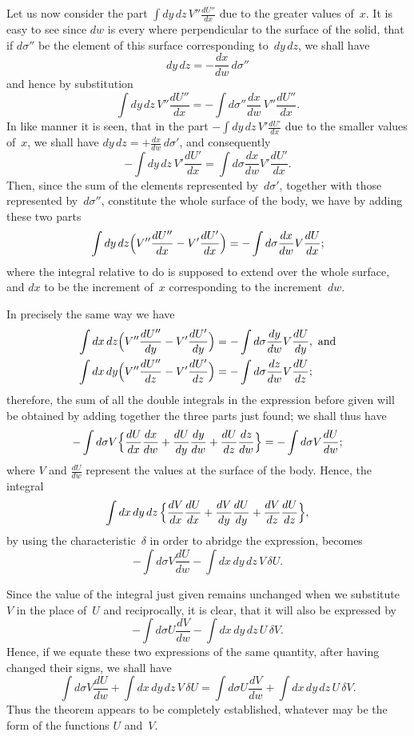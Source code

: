 \documentclass[12pt,notitlepage]{amsart}
\begin{document}
Let us now consider the part $\int dy\,dz\,V''\frac{dU''}{dx}$
due to the greater values
of~$x$. It is easy to see
since $dw$ is every where perpendicular to the surface
of the solid, that if $d\sigma''$ be the element
of this surface corresponding to~$dy\,dz$,
we shall have
\[
dy\,dz = -\frac{dx}{dw}\,d\sigma''
\]
and hence by substitution
\[
\int dy\,dz\,V''\frac{dU''}{dx}
=-\int d\sigma''\frac{dx}{dw}\,V''\frac{dU''}{dx}.
\]
In like manner it is seen, that in the part
$-\int dy\,dz\,V'\frac{dU'}{dx}$ due to the smaller
values of~$x$, we shall have $dy\,dz=+\frac{dx}{dw}\,d\sigma'$,
and consequently
\[
-\int dy\,dz\,V'\frac{dU'}{dx}=
\int d\sigma\frac{dx}{dw}V'\frac{dU'}{dx}.
\]
Then, since the sum of the elements represented by~$d\sigma'$,
together with those
represented by~$d\sigma''$,
constitute the whole surface of the body, we have by
adding these two parts
\[
\int dy\,dz\Bigl(V''\frac{dU''}{dx}-V'\frac{dU'}{dx}\Bigr)=
-\int d\sigma\frac{dx}{dw}V\frac{dU}{dx};
\]
where the integral relative to do is supposed to extend over the whole surface,
and $dx$ to be the increment of~$x$ corresponding to the increment~$dw$.

In precisely the same way we have
\[
\begin{aligned}
\int dx\,dz\Bigl(V''\frac{dU''}{dy}-V'\frac{dU'}{dy}\Bigr)&=
-\int d\sigma\frac{dy}{dw}V\frac{dU}{dy}, \text{~and}\\
\int dx\,dy\Bigl(V''\frac{dU''}{dz}-V'\frac{dU'}{dz}\Bigr)&=
-\int d\sigma\frac{dz}{dw}V\frac{dU}{dz};
\end{aligned}
\]
therefore, the sum of all the double integrals in the expression before given
will be obtained by adding together the three parts just found; we shall
thus have
\[
-\int d\sigma V\Bigl\{
  \frac{dU}{dx}\frac{dx}{dw}
  +\frac{dU}{dy}\frac{dy}{dw}
  +\frac{dU}{dz}\frac{dz}{dw}
\Bigr\}=-\int d\sigma V \frac{dU}{dw};
\]
where $V$ and $\frac{dU}{dw}$ represent the values
at the surface of the body. Hence, the integral
\[
\int dx\,dy\,dz\,
\Bigl\{
  \frac{dV}{dx}\frac{dU}{dx}
  +\frac{dV}{dy}\frac{dU}{dy}
  +\frac{dV}{dz}\frac{dU}{dz}
\Bigr\},
\]
by using the characteristic~$\delta$
in order to abridge the expression, becomes
\[
-\int d\sigma V \frac{dU}{dw}-\int dx\,dy\,dz\,V\,\delta U.
\]

Since the value of the integral just given remains unchanged when
we substitute $V$ in the place of~$U$ and reciprocally,
it is clear, that it will
also be expressed by
\[
-\int d\sigma U \frac{dV}{dw}-\int dx\,dy\,dz\,U\,\delta V.
\]
Hence, if we equate these two expressions of the same quantity, after having
changed their signs, we shall have
\[
\tag{2.}
\int d\sigma V \frac{dU}{dw}+\int dx\,dy\,dz\,V\,\delta U=
\int d\sigma U \frac{dV}{dw}+\int dx\,dy\,dz\,U\,\delta V.
\]
Thus the theorem appears to be completely established, whatever may be the
form of the functions $U$ and~$V$.
\end{document}
